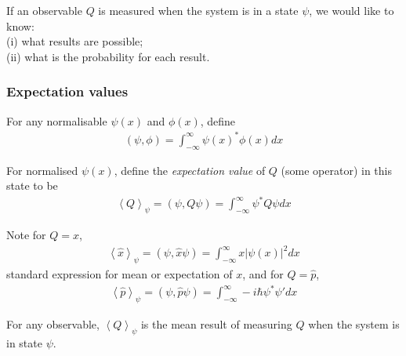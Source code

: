 \documentclass[a4paper]{article}
\begin{document}
If an observable $Q$ is measured when the system is in a state $\psi$, we would like to know:\\
(i) what results are possible;\\
(ii) what is the probability for each result.

\subsubsection{Expectation values}
For any normalisable $\psi\left(x\right)$ and $\phi\left(x\right)$, define
\begin{equation*}
\begin{aligned}
\left(\psi,\phi\right) = \int_{-\infty}^\infty \psi\left(x\right)^* \phi\left(x\right) dx
\end{aligned}
\end{equation*}

For normalised $\psi\left(x\right)$, define the \emph{expectation value} of $Q$ (some operator) in this state to be
\begin{equation*}
\begin{aligned}
\left<Q\right>_\psi = \left(\psi,Q\psi\right) = \int_{-\infty}^\infty \psi^* Q\psi dx
\end{aligned}
\end{equation*}

Note for $Q=\hat{x}$,
\begin{equation*}
\begin{aligned}
\left<\hat{x}\right>_\psi = \left(\psi,\hat{x}\psi\right)=\int_{-\infty}^\infty x|\psi\left(x\right)|^2 dx
\end{aligned}
\end{equation*}
standard expression for mean or expectation of $x$, and for $Q=\hat{p}$,
\begin{equation*}
\begin{aligned}
\left<\hat{p}\right>_\psi = \left(\psi,\hat{p}\psi\right) = \int_{-\infty}^\infty -i\hbar \psi^* \psi' dx
\end{aligned}
\end{equation*}

\begin{post}
For any observable, $\left<Q\right>_\psi$ is the mean result of measuring $Q$ when the system is in state $\psi$.
\end{post}
\end{document}
